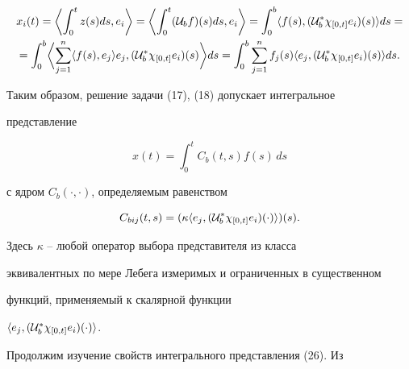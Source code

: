 \begin{gather*}


x_i(t)=\biggl\langle\int_0^tz(s)ds,e_i\biggr\rangle =


\biggl\langle\int_0^t({\cal U}_bf)(s)ds,e_i\biggr\rangle= 


\int_0^b\langle f(s),({\cal U}_b^*\chi_{[0,t]}e_i)(s)\rangle ds=\\


%


=\int_0^b\biggl\langle\sum_{j=1}^n \langle f(s),


e_j\rangle e_j,({\cal U}_b^*\chi_{[0,t]}e_i)(s)\biggr\rangle ds= 


\int_0^b\sum_{j=1}^nf_j(s)\langle e_j,({\cal U}_b^*\chi_{[0,


t]}e_i)(s)\rangle ds.


\end{gather*}





Таким образом, решение задачи (17), (18) допускает интегральное


представление


%


\begin{equation}


x(t)=\int_0^tC_b(t,s)f(s)\,ds


\end{equation}


%


с ядром $C_b(\cdot,\cdot)$, определяемым равенством


%


\begin{equation}


C_{bij}(t,s)=(\kappa\langle e_j,({\cal U}_b^*\chi_{[0,t]}e_i)(\cdot)\rangle )(s).


\end{equation}


%


Здесь $\kappa$ -- любой оператор выбора представителя из класса


эквивалентных по мере Лебега измеримых и ограниченных в существенном


функций, применяемый к скалярной функции


$\langle e_j,({\cal U}_b^*\chi_{[0, t]}e_i)(\cdot)\rangle$.





Продолжим изучение свойств интегрального представления (26). Из


